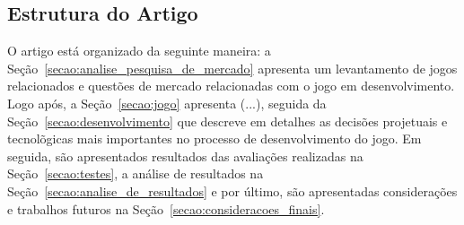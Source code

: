 \subsection{Estrutura do Artigo}
\label{secao:estrutura_do_artigo}
O artigo está organizado da seguinte maneira: a Seção~\ref{secao:analise_pesquisa_de_mercado} apresenta um levantamento de jogos relacionados e questões de mercado relacionadas com o jogo em desenvolvimento. Logo após, a Seção~\ref{secao:jogo} apresenta (...), seguida da Seção~\ref{secao:desenvolvimento} que descreve em detalhes as decisões projetuais e tecnolõgicas mais importantes no processo de desenvolvimento do jogo. Em seguida, são apresentados resultados das avaliações realizadas na Seção~\ref{secao:testes}, a análise de resultados na Seção~\ref{secao:analise_de_resultados} e por último, são apresentadas considerações e trabalhos futuros na Seção~\ref{secao:consideracoes_finais}.